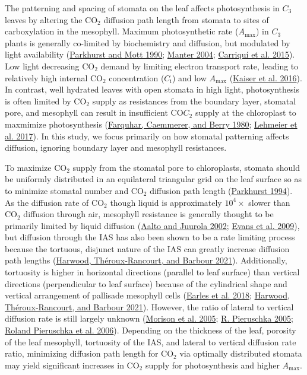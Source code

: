 \documentclass[12pt,halfline,a4paper,]{ouparticle}
\begin{document}
The patterning and spacing of stomata on the leaf affects photosynthesis
in \(C_3\) leaves by altering the CO\(_2\) diffusion path length from
stomata to sites of carboxylation in the mesophyll. Maximum
photosynthetic rate (\(A_\text{max}\)) in \(C_3\) plants is generally
co-limited by biochemistry and diffusion, but modulated by light
availability
(\protect\hyperlink{ref-parkhurst_intercellular_1990}{Parkhurst and Mott
1990}; \protect\hyperlink{ref-manter_ci_2004}{Manter 2004};
\protect\hyperlink{ref-carriqui_diffusional_2015}{Carriquí et al.
2015}). Low light decreasing CO\(_2\) demand by limiting electron
transport rate, leading to relatively high internal CO\(_2\)
concentration (\(C_\text{i}\)) and low \(A_\text{max}\)
(\protect\hyperlink{ref-kaiser_metabolic_2016}{Kaiser et al. 2016}). In
contrast, well hydrated leaves with open stomata in high light,
photosynthesis is often limited by CO\(_2\) supply as resistances from
the boundary layer, stomatal pore, and mesophyll can result in
insufficient CO\(C_2\) supply at the chloroplast to maxmimize
photosynthesis
(\protect\hyperlink{ref-farquhar_biochemical_1980}{Farquhar, Caemmerer,
and Berry 1980}; \protect\hyperlink{ref-lehmeier_cell_2017}{Lehmeier et
al. 2017}). In this study, we focus primarily on how stomatal patterning
affects diffusion, ignoring boundary layer and mesophyll resistances.

To maximize CO\(_2\) supply from the stomatal pore to chloroplasts,
stomata should be uniformly distributed in an equilateral triangular
grid on the leaf surface so as to minimize stomatal number and CO\(_2\)
diffusion path length
(\protect\hyperlink{ref-parkhurst_diffusion_1994}{Parkhurst 1994}). As
the diffusion rate of CO\(_2\) though liquid is approximately
\(10^4\times\) slower than CO\(_2\) diffusion through air, mesophyll
resistance is generally thought to be primarily limited by liquid
diffusion (\protect\hyperlink{ref-aalto_three-dimensional_2002}{Aalto
and Juurola 2002}; \protect\hyperlink{ref-evans_resistances_2009}{Evans
et al. 2009}), but diffusion through the IAS has also been shown to be a
rate limiting process because the tortuous, disjunct nature of the IAS
can greatly increase diffusion path lengths
(\protect\hyperlink{ref-harwood_understanding_2021}{Harwood,
Théroux‐Rancourt, and Barbour 2021}). Additionally, tortuosity is higher
in horizontal directions (parallel to leaf surface) than vertical
directions (perpendicular to leaf surface) because of the cylindrical
shape and vertical arrangement of pallisade mesophyll cells
(\protect\hyperlink{ref-earles_beyond_2018}{Earles et al. 2018};
\protect\hyperlink{ref-harwood_understanding_2021}{Harwood,
Théroux‐Rancourt, and Barbour 2021}). However, the ratio of lateral to
vertical diffusion rate is still largely unknown
(\protect\hyperlink{ref-morison_lateral_2005}{Morison et al. 2005};
\protect\hyperlink{ref-pieruschka_lateral_2005}{R. Pieruschka 2005};
\protect\hyperlink{ref-pieruschka_lateral_2006}{Roland Pieruschka et al.
2006}). Depending on the thickness of the leaf, porosity of the leaf
mesophyll, tortuosity of the IAS, and lateral to vertical diffusion rate
ratio, minimizing diffusion path length for CO\(_2\) via optimally
distributed stomata may yield significant increases in CO\(_2\) supply
for photosynthesis and higher \(A_\text{max}\).
\end{document}
